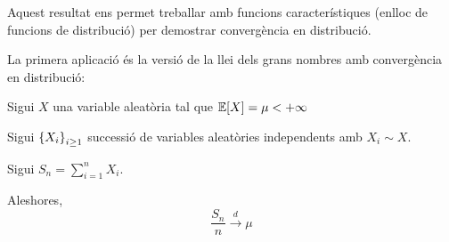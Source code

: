 Aquest resultat ens permet treballar amb funcions característiques (enlloc de funcions de distribució) per
demostrar convergència en distribució.

La primera aplicació és la versió de la llei dels grans nombres amb convergència en distribució:

\begin{thm}
  Sigui $X$ una variable aleatòria tal que $\mathbb{E}[X] = \mu < +\infty$
  
  Sigui $\left\{X_i\right\}_{i\geq1}$ successió de variables aleatòries independents amb $X_i \sim X$.
  
  Sigui $S_n = \sum\limits_{i=1}^n X_i$.
  
  Aleshores,
  \[
    \frac{S_n}{n} \overset{d}{\to} \mu
  \]
\end{thm}

\begin{thm}
  
\end{thm}
